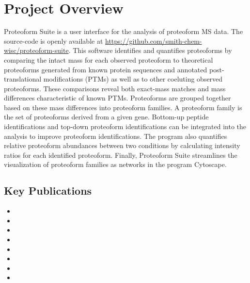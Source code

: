 

\pagebreak
{}
\section*{Project Overview}

Proteoform Suite is a user interface for the analysis of proteoform MS data. The source-code is openly available at \url{https://github.com/smith-chem-wisc/proteoform-suite}. This software identifies and quantifies proteoforms by comparing the intact mass for each observed proteoform to theoretical proteoforms generated from known protein sequences and annotated post-translational modifications (PTMs) as well as to other coeluting observed proteoforms. These comparisons reveal both exact-mass matches and mass differences characteristic of known PTMs. Proteoforms are grouped together based on these mass differences into proteoform families. A proteoform family is the set of proteoforms derived from a given gene. Bottom-up peptide identifications and top-down proteoform identifications can be integrated into the analysis to improve proteoform identifications. The program also quantifies relative proteoform abundances between two conditions by calculating intensity ratios for each identified proteoform. Finally, Proteoform Suite streamlines the visualization of proteoform families as networks in the program Cytoscape. 
\\
\subsection*{Key Publications}
\begin{itemize}
\item {}
\item {}
\item {}
\item  {}
\item {}
\item {}
\item {}
\item {}
\end{itemize}